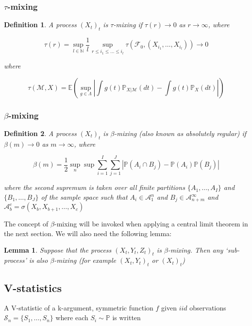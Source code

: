 \documentclass{article}
\newtheorem{definition}{Definition}
\newtheorem{lemma}{Lemma}
\begin{document}
\subsubsection{$\tau$-mixing}
\begin{definition}
A process $(X_t)_{t}$ is \emph{$\tau$-mixing} if $\tau(r) \longrightarrow 0$ as $r\longrightarrow \infty$, where

\[\tau(r) = \sup_{l\in \mathbb{N}} \frac{1}{l} \sup_{r\leq i_1 \leq \ldots \leq i_l} \tau(\mathcal{F}_0,(X_{i_1}, \ldots, X_{i_l})) \longrightarrow 0\]

where

\[ \tau(\mathcal{M},X) = \mathbb{E} (\sup_{g \in \Lambda} | \int g(t) \mathbb{P}_{X|\mathcal{M}}(dt) -  \int g(t) \mathbb{P}_{X}(dt) |)\]

\end{definition}

\subsubsection{$\beta$-mixing}


\begin{definition}
A process $(X_t)_{t}$ is \emph{$\beta$-mixing} (also known as \emph{absolutely regular}) if $\beta(m) \longrightarrow 0$ as $m\longrightarrow \infty$, where

\[ \beta(m) = \frac{1}{2} \sup_n \sup \sum_{i=1}^I \sum_{j=1}^J | \mathbb{P}(A_i \cap B_j) - \mathbb{P}(A_i)\mathbb{P}(B_j)| \]

where the second supremum is taken  over all finite partitions $\{A_1,\ldots, A_I \}$ and  $\{B_1,\ldots, B_J\}$ of the sample space such that $A_i \in \mathcal{A}_1^n$ and $B_j \in \mathcal{A}_{n+m}^\infty$ and $\mathcal{A}_b^c = \sigma(X_b,X_{b+1},\ldots,X_{c})$
\end{definition}

The concept of $\beta$-mixing will be invoked when applying a central limit theorem in the next section. We will also need the following lemma:

\begin{lemma}\label{lemma:beta}
Suppose that the process $(X_t,Y_t,Z_t)_t$ is $\beta$-mixing. Then any `sub-process' is also $\beta$-mixing (for example $(X_t,Y_t)_t$ or $(X_t)_t$)
\end{lemma}

\subsection{V-statistics}
A V-statistic of a k-argument, symmetric function $f$ given $iid$ observations $\mathcal{S}_n = \{S_1,\ldots,S_n\}$ where each $S_i \sim \mathbb{P}$ is written
\end{document}
